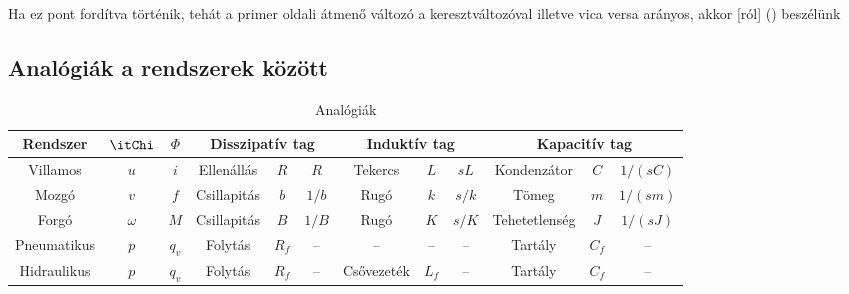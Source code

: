 \documentclass[../main.tex]{subfiles}
\begin{document}
Ha ez pont fordítva történik, tehát a primer oldali átmenő változó a keresztváltozóval
illetve vica versa arányos, akkor [ról] () beszélünk

\subsection{Analógiák a rendszerek között}

\bgroup
\def\arraystretch{1.2}
\begin{table}[H]
  \centering
  \begin{adjustbox}{angle=90}
    \begin{tabular}{| c | c | c || c | c | c || c | c |c	|| c | c | c |}
      \hline
      Rendszer                              & $\itChi$ & $\varPhi$ &
      \multicolumn{3}{c||}{Disszipatív tag} &
      \multicolumn{3}{c||}{Induktív tag}    &
      \multicolumn{3}{c|}{Kapacitív tag}
      \\ \hline \hline
      Villamos                              & $u$      & $i$       &
      Ellenállás                            & $R$      & $R$       &
      Tekercs                               & $L$      & $sL$      &
      Kondenzátor                           & $C$      & $1/(sC)$
      \\ \hline
      Mozgó                                 & $v$      & $f$       &
      Csillapitás                           & $b$      & $1/b$     &
      Rugó                                  & $k$      & $s/k$     &
      Tömeg                                 & $m$      & $1/(sm)$
      \\ \hline
      Forgó                                 & $\omega$ & $M$       &
      Csillapitás                           & $B$      & $1/B$     &
      Rugó                                  & $K$      & $s/K$     &
      Tehetetlenség                         & $J$      & $1/(sJ)$
      \\ \hline
      Pneumatikus                           & $p$      & $q_v$     &
      Folytás                               & $R_f$    & --        &
      --                                    & --       & --        &
      Tartály                               & $C_f$    & --
      \\ \hline
      Hidraulikus                           & $p$      & $q_v$     &
      Folytás                               & $R_f$    & --        &
      Csővezeték                            & $L_f$    & --        &
      Tartály                               & $C_f$    & --
      \\ \hline
    \end{tabular}
  \end{adjustbox}
  \caption{Analógiák}
  \label{fig:analogies}
\end{table}
\egroup
\end{document}
